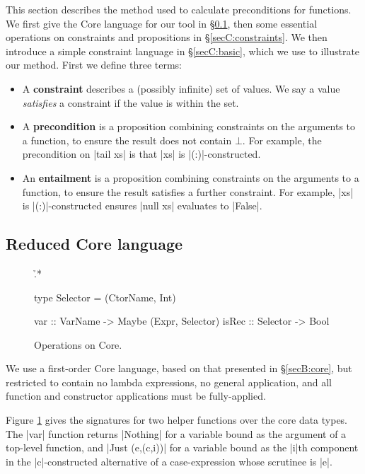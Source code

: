 This section describes the method used to calculate preconditions for functions. We first give the Core language for our tool in \S\ref{secC:catch_core}, then some essential operations on constraints and propositions in \S\ref{secC:constraints}. We then introduce a simple constraint language in \S\ref{secC:basic}, which we use to illustrate our method. First we define three terms:

\begin{itemize}
\item A \textbf{constraint} describes a (possibly infinite) set of values. We say a value \textit{satisfies} a constraint if the value is within the set.
\item A \textbf{precondition} is a proposition combining constraints on the arguments to a function, to ensure the result does not contain $\bot{}$. For example, the precondition on |tail xs| is that |xs| is |(:)|-constructed.
\item An \textbf{entailment}  is a proposition combining constraints on the arguments to a function, to ensure the result satisfies a further constraint. For example, |xs| is |(:)|-constructed ensures |null xs| evaluates to |False|.
\end{itemize}

\subsection{Reduced Core language}
\label{secC:catch_core}


\begin{figure}
\h{.*}\begin{code}
type Selector  =  (CtorName, Int)

var    :: VarName   -> Maybe (Expr, Selector)
isRec  :: Selector  -> Bool
\end{code}
\caption{Operations on Core.}
\label{figC:catch_core_operations}
\end{figure}

We use a first-order Core language, based on that presented in \S\ref{secB:core}, but restricted to contain no lambda expressions, no general application, and all function and constructor applications must be fully-applied.

Figure \ref{figC:catch_core_operations} gives the signatures for two helper functions over the core data types. The |var| function returns |Nothing| for a variable bound as the argument of a top-level function, and |Just (e,(c,i))| for a variable bound as the |i|th component in the |c|-constructed alternative of a case-expression whose scrutinee is |e|.

